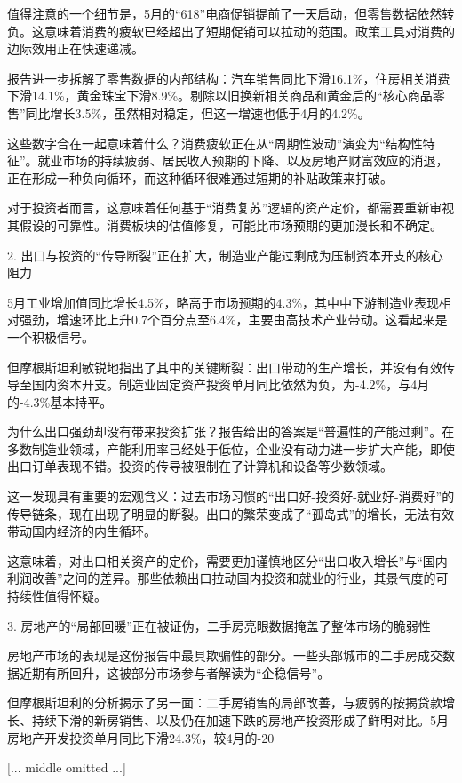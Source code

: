 \documentclass[11pt]{ctexart}
\begin{document}
值得注意的一个细节是，5月的“618”电商促销提前了一天启动，但零售数据依然转负。这意味着消费的疲软已经超出了短期促销可以拉动的范围。政策工具对消费的边际效用正在快速递减。

报告进一步拆解了零售数据的内部结构：汽车销售同比下滑16.1\%，住房相关消费下滑14.1\%，黄金珠宝下滑8.9\%。剔除以旧换新相关商品和黄金后的“核心商品零售”同比增长3.5\%，虽然相对稳定，但这一增速也低于4月的4.2\%。

这些数字合在一起意味着什么？消费疲软正在从“周期性波动”演变为“结构性特征”。就业市场的持续疲弱、居民收入预期的下降、以及房地产财富效应的消退，正在形成一种负向循环，而这种循环很难通过短期的补贴政策来打破。

对于投资者而言，这意味着任何基于“消费复苏”逻辑的资产定价，都需要重新审视其假设的可靠性。消费板块的估值修复，可能比市场预期的更加漫长和不确定。

2. 出口与投资的“传导断裂”正在扩大，制造业产能过剩成为压制资本开支的核心阻力

5月工业增加值同比增长4.5\%，略高于市场预期的4.3\%，其中中下游制造业表现相对强劲，增速环比上升0.7个百分点至6.4\%，主要由高技术产业带动。这看起来是一个积极信号。

但摩根斯坦利敏锐地指出了其中的关键断裂：出口带动的生产增长，并没有有效传导至国内资本开支。制造业固定资产投资单月同比依然为负，为-4.2\%，与4月的-4.3\%基本持平。

为什么出口强劲却没有带来投资扩张？报告给出的答案是“普遍性的产能过剩”。在多数制造业领域，产能利用率已经处于低位，企业没有动力进一步扩大产能，即使出口订单表现不错。投资的传导被限制在了计算机和设备等少数领域。

这一发现具有重要的宏观含义：过去市场习惯的“出口好-投资好-就业好-消费好”的传导链条，现在出现了明显的断裂。出口的繁荣变成了“孤岛式”的增长，无法有效带动国内经济的内生循环。

这意味着，对出口相关资产的定价，需要更加谨慎地区分“出口收入增长”与“国内利润改善”之间的差异。那些依赖出口拉动国内投资和就业的行业，其景气度的可持续性值得怀疑。

3. 房地产的“局部回暖”正在被证伪，二手房亮眼数据掩盖了整体市场的脆弱性

房地产市场的表现是这份报告中最具欺骗性的部分。一些头部城市的二手房成交数据近期有所回升，这被部分市场参与者解读为“企稳信号”。

但摩根斯坦利的分析揭示了另一面：二手房销售的局部改善，与疲弱的按揭贷款增长、持续下滑的新房销售、以及仍在加速下跌的房地产投资形成了鲜明对比。5月房地产开发投资单月同比下滑24.3\%，较4月的-20

[... middle omitted ...]
\end{document}
